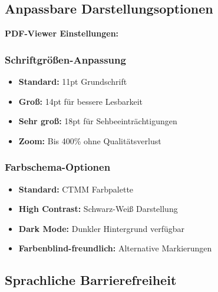 \subsection{Anpassbare Darstellungsoptionen}

\begin{ctmmGreenBox}[title=Personalisierbare Einstellungen]

\textbf{PDF-Viewer Einstellungen:}

\subsubsection{Schriftgrößen-Anpassung}
\begin{itemize}
    \item \textbf{Standard:} 11pt Grundschrift
    \item \textbf{Groß:} 14pt für bessere Lesbarkeit
    \item \textbf{Sehr groß:} 18pt für Sehbeeinträchtigungen
    \item \textbf{Zoom:} Bis 400\% ohne Qualitätsverlust
\end{itemize}

\subsubsection{Farbschema-Optionen}
\begin{itemize}
    \item \textbf{Standard:} CTMM Farbpalette
    \item \textbf{High Contrast:} Schwarz-Weiß Darstellung
    \item \textbf{Dark Mode:} Dunkler Hintergrund verfügbar
    \item \textbf{Farbenblind-freundlich:} Alternative Markierungen
\end{itemize}

\end{ctmmGreenBox}

\subsection{Sprachliche Barrierefreiheit}


